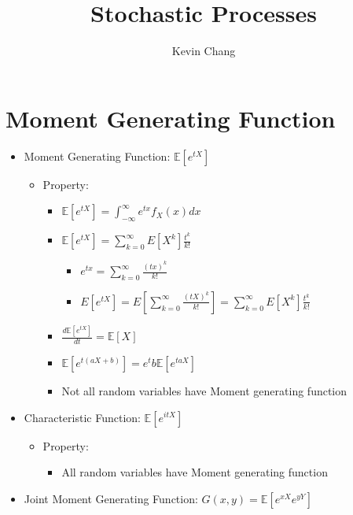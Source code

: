 \documentclass[a4paper]{article}
\title{Stochastic Processes}
\author{Kevin Chang}
\begin{document}
\maketitle

\section{Moment Generating Function}
\begin{itemize}
    \item Moment Generating Function: $\mathbb{E}[e^{tX}]$
        \begin{itemize}
            \item Property:
                \begin{itemize}
                    \item $\mathbb{E}[e^{tX}] = \int_{-\infty}^\infty e^{tx} f_X(x) dx$
                    \item $\mathbb{E}[e^{tX}] = \sum_{k=0}^\infty \mathit{E}[X^k] \frac{t^k}{k!}$
                        \begin{itemize}
                            \item $e^{tx} = \sum_{k=0}^\infty \frac{(tx)^k}{k!}$
                            \item $\mathit{E}[e^{tX}] = \mathit{E}[\sum_{k=0}^\infty \frac{(tX)^k}{k!}] = \sum_{k=0}^\infty \mathit{E}[X^k] \frac{t^k}{k!}$
                        \end{itemize}
                    \item $\frac{d\mathbb{E}[e^{tX}]}{dt} = \mathbb{E}[X]$
                    \item $\mathbb{E}[e^{t(aX+b)}] = e^tb\mathbb{E}[e^{taX}]$
                    \item Not all random variables have Moment generating function
                \end{itemize}
        \end{itemize}
    \item Characteristic Function: $\mathbb{E}[e^{itX}]$
        \begin{itemize}
            \item Property:
                \begin{itemize}
                    \item All random variables have Moment generating function
                \end{itemize}
        \end{itemize}
    \item Joint Moment Generating Function: $G(x, y) = \mathbb{E}[e^{xX}e^{yY}]$

\end{itemize}
\end{document}
